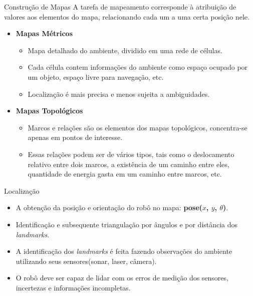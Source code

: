 \documentclass{beamer}
\newlength{\wideitemsep}
\let\olditem\item
\renewcommand{\item}{\setlength{\itemsep}{\wideitemsep}\olditem}
\begin{document}
\begin{frame}{Construção de Mapas}
A tarefa de mapeamento corresponde à atribuição de valores aos elementos do mapa, relacionando cada um a uma certa 
posição nele.
\begin{itemize}
 \item \textbf{Mapas Métricos}
    \begin{itemize}
    \item Mapa detalhado do ambiente, dividido em uma rede de células.
    \item Cada célula contem informações do ambiente como espaço ocupado por um objeto, 
    espaço livre para navegação, etc.
    \item Localização é mais precisa e menos sujeita a ambiguidades.
    \end{itemize}

 \item \textbf{Mapas Topológicos}
      \begin{itemize}
    \item  Marcos e relações são os elementos dos mapas topológicos, concentra-se apenas em pontos de interesse.
    \item Essas relações podem ser de vários tipos, tais como o deslocamento
relativo entre dois marcos, a existência de um caminho entre eles,
quantidade de energia gasta em um caminho entre marcos, etc.
    \end{itemize}
\end{itemize}
\end{frame}

\begin{frame}{Localização}

 \begin{itemize}
  \item A obtenção da posição e orientação do robô no mapa: \textbf{pose($x$, $y$, $\theta$)}.
  
  \item Identificação e subsequente triangulação por ângulos e por distância dos \textit{landmarks}.
  
  \item A identificação dos \textit{landmarks} 
 é feita fazendo observações do ambiente utilizando seus sensores(sonar, laser, câmera).
 
  \item O robô deve ser capaz de lidar com os erros de medição dos sensores, 
 incertezas e informações incompletas.
\end{itemize}
\end{frame}
\end{document}

